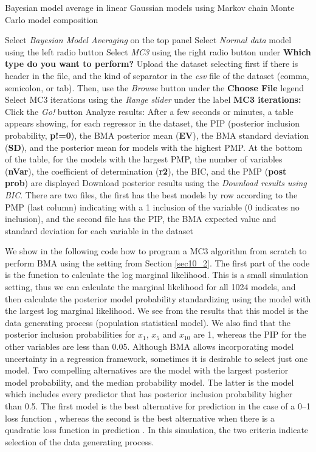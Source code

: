 \begin{algorithm}[h!]
	\caption{Bayesian model average in linear Gaussian models using Markov chain Monte Carlo model composition}\label{alg:BMAnormalMC3}
	\begin{algorithmic}[1]  		 			
		\State Select \textit{Bayesian Model Averaging} on the top panel
		\State Select \textit{Normal data} model using the left radio button
		\State Select \textit{MC3} using the right radio button under \textbf{Which type do you want to perform?}
		\State Upload the dataset selecting first if there is header in the file, and the kind of separator in the \textit{csv} file of the dataset (comma, semicolon, or tab). Then, use the \textit{Browse} button under the \textbf{Choose File} legend
		\State Select MC3 iterations using the \textit{Range slider} under the label \textbf{MC3 iterations:}
		\State Click the \textit{Go!} button
		\State Analyze results: After a few seconds or minutes, a table appears showing, for each regressor in the dataset, the PIP (posterior inclusion probability, \textbf{p!=0}), the BMA posterior mean (\textbf{EV}), the BMA standard deviation (\textbf{SD}), and the posterior mean for models with the highest PMP. At the bottom of the table, for the models with the largest PMP, the number of variables (\textbf{nVar}), the coefficient of determination (\textbf{r2}), the BIC, and the PMP (\textbf{post prob}) are displayed
		\State Download posterior results using the \textit{Download results using BIC}. There are two files, the first has the best models by row according to the PMP (last column) indicating with a 1 inclusion of the variable (0 indicates no inclusion), and the second file has the PIP, the BMA expected value and standard deviation for each variable in the dataset
	\end{algorithmic} 
\end{algorithm}

We show in the following code how to program a MC3 algorithm from scratch to perform BMA using the setting from Section \ref{sec10_2}. The first part of the code is the function to calculate the log marginal likelihood. This is a small simulation setting, thus we can calculate the marginal likelihood for all 1024 models, and then calculate the posterior model probability standardizing using the model with the largest log marginal likelihood. We see from the results that this model is the data generating process (population statistical model). We also find that the posterior inclusion probabilities for $x_{1}$, $x_{5}$ and $x_{10}$ are 1, whereas the PIP for the other variables are less than 0.05. Although BMA allows incorporating model uncertainty in a regression framework, sometimes it is desirable to select just one model. Two compelling alternatives are the model with the largest posterior model probability, and the median probability model. The latter is the model which includes every predictor that has posterior inclusion probability higher than 0.5. The first model is the best alternative for prediction in the case of a 0--1 loss function \cite{Clyde2004}, whereas the second is the best alternative when there is a quadratic loss function in prediction \cite{Barbieri2004}. In this simulation, the two criteria indicate selection of the data generating process.

